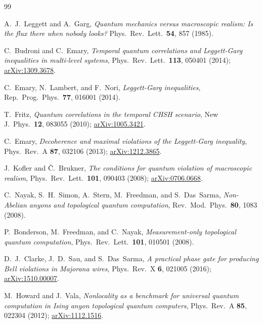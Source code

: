 \documentclass[aps,prx,reprint,amsmath,amssymb,floatfix,nofootinbib,superscriptaddress]{revtex4-2}
\begin{document}
\begin{thebibliography}{99}

A.~J.~Leggett and A.~Garg,
\emph{Quantum mechanics versus macroscopic realism: Is the flux there when nobody looks?}
Phys.\ Rev.\ Lett.\ \textbf{54}, 857 (1985).

C.~Budroni and C.~Emary,
\emph{Temporal quantum correlations and Leggett-Garg inequalities in multi-level systems},
Phys.\ Rev.\ Lett.\ \textbf{113}, 050401 (2014);
\href{https://arxiv.org/abs/1309.3678}{arXiv:1309.3678}.

C.~Emary, N.~Lambert, and F.~Nori,
\emph{Leggett-Garg inequalities},
Rep.\ Prog.\ Phys.\ \textbf{77}, 016001 (2014).

T.~Fritz,
\emph{Quantum correlations in the temporal CHSH scenario},
New J.\ Phys.\ \textbf{12}, 083055 (2010);
\href{https://arxiv.org/abs/1005.3421}{arXiv:1005.3421}.

C.~Emary,
\emph{Decoherence and maximal violations of the Leggett-Garg inequality},
Phys.\ Rev.\ A \textbf{87}, 032106 (2013);
\href{https://arxiv.org/abs/1212.3865}{arXiv:1212.3865}.

J.~Kofler and \v{C}.~Brukner,
\emph{The conditions for quantum violation of macroscopic realism},
Phys.\ Rev.\ Lett.\ \textbf{101}, 090403 (2008);
\href{https://arxiv.org/abs/0706.0668}{arXiv:0706.0668}.

C.~Nayak, S.~H.~Simon, A.~Stern, M.~Freedman, and S.~Das~Sarma,
\emph{Non-Abelian anyons and topological quantum computation},
Rev.\ Mod.\ Phys.\ \textbf{80}, 1083 (2008).

P.~Bonderson, M.~Freedman, and C.~Nayak,
\emph{Measurement-only topological quantum computation},
Phys.\ Rev.\ Lett.\ \textbf{101}, 010501 (2008).

D.~J.~Clarke, J.~D.~Sau, and S.~Das~Sarma,
\emph{A practical phase gate for producing Bell violations in Majorana wires},
Phys.\ Rev.\ X \textbf{6}, 021005 (2016);
\href{https://arxiv.org/abs/1510.00007}{arXiv:1510.00007}.

M.~Howard and J.~Vala,
\emph{Nonlocality as a benchmark for universal quantum computation in Ising anyon topological quantum computers},
Phys.\ Rev.\ A \textbf{85}, 022304 (2012);
\href{https://arxiv.org/abs/1112.1516}{arXiv:1112.1516}.


\end{thebibliography}
\end{document}
